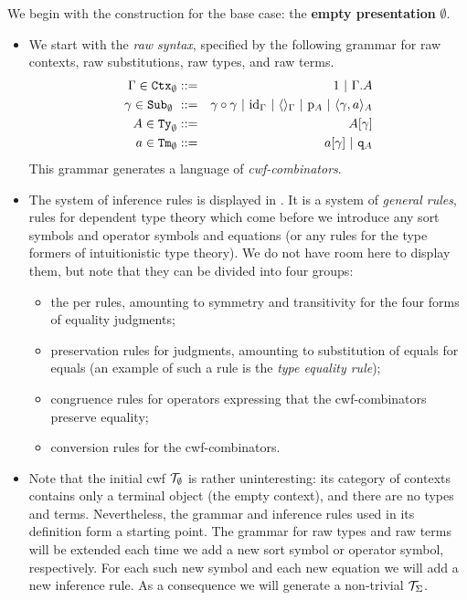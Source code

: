 \documentclass{lmcs}
\newcommand{\FYI}[1]{{\color{red}#1}}
\def\id{\mathrm{id}}
\begin{document}
We begin with the construction for the base case: the {\bf empty \FYI{presentation}} $\emptyset$.
\begin{itemize}
\item
We start with the {\em raw syntax}, specified by the following grammar for raw contexts, raw substitutions, raw types, and raw terms.
\begin{eqnarray*}
\Gamma \in \RawCtx_\emptyset &::=& 1  \ |\ \Gamma\cext A\\
\gamma \in \RawSub_\emptyset  \ &::=& \gamma \circ \gamma \ |\ \id_\Gamma \ |\ \langle\rangle_\Gamma \ |\ \p_{A} \ |\ \langle \gamma, a \rangle_A\\
A \in \RawTy_\emptyset  &::=& A[\gamma]\\
a \in \RawTm_\emptyset  &::=& a[\gamma] \ |\ \qI_A
\end{eqnarray*}
This grammar generates a language of {\em cwf-combinators}.
\item
The system of inference rules is displayed in \cite{castellan:tlca2015,castellan:lmcs}. It is a system of {\em general rules}, rules for dependent type theory which come before we introduce any sort symbols and operator symbols and equations (or any rules for the type formers of intuitionistic type theory). We do not have room here to display them, but note that they can be divided into four groups:
\begin{itemize}
\item the per rules, amounting to symmetry and transitivity for the four forms of equality judgments;
\item preservation rules for judgments, amounting to substitution of equals for equals (an example of such a rule is the {\em type equality rule});
\item congruence rules for operators expressing that the cwf-combinators preserve equality;
\item conversion rules for the cwf-combinators.
\end{itemize}
\item
Note that the initial cwf ${\mathcal T}_\emptyset$ is rather uninteresting: its category of contexts contains only a terminal object (the empty context), and there are no types and terms. Nevertheless, the grammar and inference rules used in its definition form a starting point. The grammar for raw types and raw terms will be extended each time we add a new sort symbol or operator symbol, respectively. For each such new symbol and each new equation we will add a new inference rule. As a consequence we will generate a non-trivial ${\mathcal T}_\Sigma$.
\end{itemize}
\end{document}
